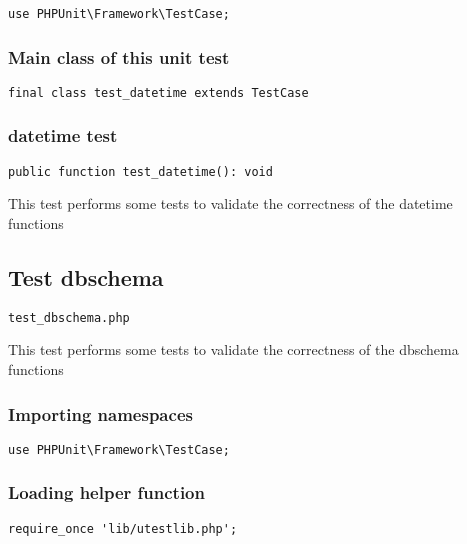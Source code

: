 \documentclass[a4paper]{article}
\begin{document}
\begin{lstlisting}
use PHPUnit\Framework\TestCase;
\end{lstlisting}

\hypertarget{toc131}{}
\subsubsection{Main class of this unit test}

\begin{lstlisting}
final class test_datetime extends TestCase
\end{lstlisting}

\hypertarget{toc132}{}
\subsubsection{datetime test}

\begin{lstlisting}
public function test_datetime(): void
\end{lstlisting}

This test performs some tests to validate the correctness
of the datetime functions

\hypertarget{toc133}{}
\subsection{Test dbschema}

\begin{lstlisting}
test_dbschema.php
\end{lstlisting}

This test performs some tests to validate the correctness
of the dbschema functions

\hypertarget{toc134}{}
\subsubsection{Importing namespaces}

\begin{lstlisting}
use PHPUnit\Framework\TestCase;
\end{lstlisting}

\hypertarget{toc135}{}
\subsubsection{Loading helper function}

\begin{lstlisting}
require_once 'lib/utestlib.php';
\end{lstlisting}
\end{document}
